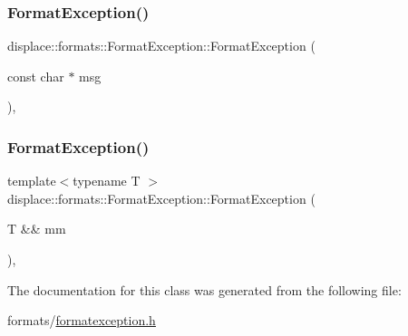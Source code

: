 \subsubsection{\texorpdfstring{FormatException()}{FormatException()}\hspace{0.1cm}{\footnotesize\ttfamily [1/2]}}
{\footnotesize\ttfamily displace\+::formats\+::\+Format\+Exception\+::\+Format\+Exception (\begin{DoxyParamCaption}\item[{const char $\ast$}]{msg }\end{DoxyParamCaption})\hspace{0.3cm}{\ttfamily [inline]}, {\ttfamily [explicit]}}

\mbox{\label{classdisplace_1_1formats_1_1_format_exception_a3ca9e058a9404af4e2c1b4577864b4f6}} 
\subsubsection{\texorpdfstring{FormatException()}{FormatException()}\hspace{0.1cm}{\footnotesize\ttfamily [2/2]}}
{\footnotesize\ttfamily template$<$typename T $>$ \\
displace\+::formats\+::\+Format\+Exception\+::\+Format\+Exception (\begin{DoxyParamCaption}\item[{T \&\&}]{mm }\end{DoxyParamCaption})\hspace{0.3cm}{\ttfamily [inline]}, {\ttfamily [explicit]}}



The documentation for this class was generated from the following file\+:\begin{DoxyCompactItemize}
\item 
formats/\mbox{\hyperlink{formatexception_8h}{formatexception.\+h}}\end{DoxyCompactItemize}
